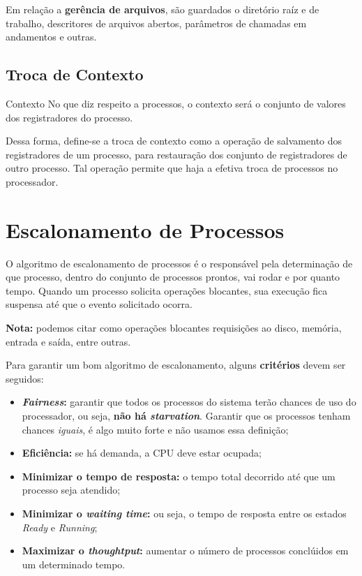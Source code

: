Em relação a \textbf{gerência de arquivos}, são guardados o diretório raíz e de trabalho, descritores de arquivos abertos, parâmetros de chamadas em andamentos e outras.




\subsection{Troca de Contexto}
\begin{definicao}{Contexto}
  No que diz respeito a processos, o contexto será o conjunto de valores dos registradores do processo.
\end{definicao}

Dessa forma, define-se a troca de contexto como a operação de salvamento dos registradores de um processo, para restauração dos conjunto de registradores de outro processo. Tal operação permite que haja a efetiva troca de processos no processador.




















\section{Escalonamento de Processos}
O algoritmo de escalonamento de processos é o responsável pela determinação de que processo, dentro do conjunto de processos prontos, vai rodar e por quanto tempo. Quando um processo solicita operações blocantes, sua execução fica suspensa até que o evento solicitado ocorra.

\textbf{Nota:} podemos citar como operações blocantes requisições ao disco, memória, entrada e saída, entre outras.

Para garantir um bom algoritmo de escalonamento, alguns \textbf{critérios} devem ser seguidos:
\begin{itemize}
  \item \textbf{\textit{Fairness}:} garantir que todos os processos do sistema terão chances de uso do processador, ou seja, \textbf{não há \textit{starvation}}. Garantir que os processos tenham chances \textit{iguais}, é algo muito forte e não usamos essa definição;

  \item \textbf{Eficiência:} se há demanda, a CPU deve estar ocupada;

  \item \textbf{Minimizar o tempo de resposta:} o tempo total decorrido até que um processo seja atendido; %

  \item \textbf{Minimizar o \textit{waiting time}:} ou seja, o tempo de resposta entre os estados \textit{Ready} e \textit{Running};

  \item \textbf{Maximizar o \textit{thoughtput}:} aumentar o número de processos conclúidos em um determinado tempo.
\end{itemize}

